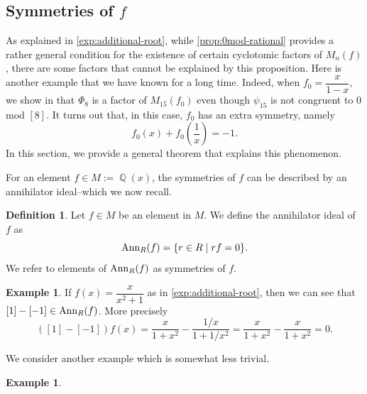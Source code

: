 \documentclass[12t,a4paper]{amsart}
\newcommand{\tung}[1]{{\color{red}#1}}
\theoremstyle{definition}
\newtheorem{definition}[thm]{Definition}
\newtheorem{expl}[thm]{Example}
\DeclareMathOperator{\Z}{\mathbb{Z}}
\DeclareMathOperator{\Q}{\mathbb{Q}}
\newcommand{\Ann}{{\rm Ann}}
\numberwithin{equation}{section}
\begin{document}
{\subsection{Symmetries of $f$}
As explained in \cref{exp:additional-root}, while \cref{prop:0mod-rational} provides a rather general condition for the existence of certain cyclotomic factors of $M_n(f)$, there are some factors that cannot be explained by this proposition. Here is another example that we have known for a long time. Indeed, when $f_0=\dfrac{x}{1-x}$, we show in \cite{chidambaram2023fekete} that $\Phi_8$ is a factor of $M_{15}(f_0)$ even though $\psi_{15}$ is not congruent to $0$ mod $[8].$ It turns out that, in this case, $f_0$ has an extra symmetry, namely 
\[ f_0(x)+f_0 \left( \frac{1}{x} \right)=-1.\]
In this section, we provide a general theorem that explains this phenomenon. 

For an element $f \in M:= \Q(x)$, the symmetries of $f$ can be described by an annihilator ideal--which we now recall. 
\begin{definition}
Let $f \in M$ be an element in $M$. We define the annihilator ideal of $f$ as 
\[ \Ann_{R}(f)=\{r \in R \mid rf = 0\}.\]
We refer to elements of \(\Ann_R(f)\) as symmetries of \(f\).
\end{definition}

\begin{expl}
    If $f(x)=\dfrac{x}{x^2+1}$ as in \cref{exp:additional-root}, then we can see that $[1]-[-1] \in \Ann_{R}(f)$. More precisely 
    \[ ([1]-[-1])f(x)= \dfrac{x}{1+x^2}-\dfrac{1/x}{1+1/x^2} = \dfrac{x}{1+x^2}-\dfrac{x}{1+x^2}=0.\]


\end{expl}
We consider  another example which is somewhat less trivial. 
\begin{expl}\label{ex:modifiedFekete}
    

\end{expl}}
\end{document}
